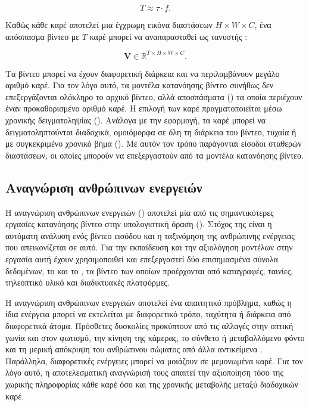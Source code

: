 \begin{equation}
    T \approx \tau \cdot f.
\end{equation}

Καθώς κάθε καρέ αποτελεί μια έγχρωμη εικόνα διαστάσεων
\(H \times W \times C\), ένα απόσπασμα βίντεο με \(T\) καρέ μπορεί να
αναπαρασταθεί ως τανυστής \cite{arnab2021vivit}:

\begin{equation}
    \mathbf{V} \in \mathbb{R}^{T \times H \times W \times C}.
\end{equation}

Τα βίντεο μπορεί να έχουν διαφορετική διάρκεια και να περιλαμβάνουν μεγάλο
αριθμό καρέ. Για τον λόγο αυτό, τα μοντέλα κατανόησης βίντεο συνήθως δεν
επεξεργάζονται ολόκληρο το αρχικό βίντεο, αλλά αποσπάσματα
() τα οποία περιέχουν έναν προκαθορισμένο αριθμό καρέ. Η
επιλογή των καρέ πραγματοποιείται μέσω χρονικής δειγματοληψίας
(). Ανάλογα με την εφαρμογή, τα καρέ μπορεί να δειγματοληπτούνται διαδοχικά, ομοιόμορφα
σε όλη τη διάρκεια του βίντεο, τυχαία ή με συγκεκριμένο χρονικό βήμα
(). Με αυτόν τον τρόπο 
παράγονται είσοδοι σταθερών διαστάσεων, οι οποίες μπορούν να επεξεργαστούν
από τα μοντέλα κατανόησης βίντεο.

\subsection{Αναγνώριση ανθρώπινων ενεργειών}
\label{subsec:human-action-recognition}

Η αναγνώριση ανθρώπινων ενεργειών () αποτελεί 
μία από τις σημαντικότερες εργασίες κατανόησης βίντεο στην υπολογιστική όραση (). 
Στόχος της είναι η αυτόματη ανάλυση ενός βίντεο εισόδου και η ταξινόμηση της 
ανθρώπινης ενέργειας που απεικονίζεται σε αυτό. Για την εκπαίδευση και την αξιολόγηση 
μοντέλων στην εργασία αυτή έχουν χρησιμοποιθεί και επεξεργαστεί δύο επισημασμένα σύνολα δεδομένων, 
το \cite{kuehne2011hmdb} και το \cite{soomro2012ucf101}, τα βίντεο των οποίων προέρχονται από καταγραφές, ταινίες, τηλεοπτικό υλικό και 
διαδικτυακές πλατφόρμες.

Η αναγνώριση ανθρώπινων ενεργειών αποτελεί ένα απαιτητικό πρόβλημα, καθώς η
ίδια ενέργεια μπορεί να εκτελείται με διαφορετικό τρόπο, ταχύτητα ή διάρκεια
από διαφορετικά άτομα. Πρόσθετες δυσκολίες προκύπτουν από τις αλλαγές στην
οπτική γωνία και στον φωτισμό, την κίνηση της κάμερας, το σύνθετο ή
μεταβαλλόμενο φόντο και τη μερική απόκρυψη του ανθρώπινου σώματος από άλλα
αντικείμενα \cite{jegham2020vision}. Παράλληλα, διαφορετικές ενέργειες
μπορεί να μοιάζουν σε μεμονωμένα καρέ. Για τον
λόγο αυτό, η αποτελεσματική αναγνώρισή τους απαιτεί την αξιοποίηση τόσο της
χωρικής πληροφορίας κάθε καρέ όσο και της χρονικής μεταβολής μεταξύ
διαδοχικών καρέ.
